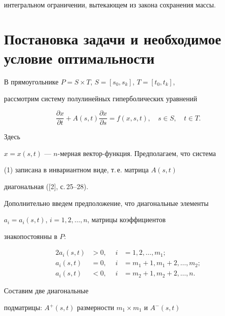 интегральном ограничении, вытекающем из закона сохранения массы.








\section{Постановка задачи и необходимое условие оптимальности}





В прямоугольнике $P=S\times T$, $S=[s_0,s_k]$, $T=[t_0,t_k]$,


рассмотрим систему полулинейных гиперболических уравнений


\begin{equation}


\frac{\partial x}{\partial t} +A(s,t)\frac{\partial x}{\partial s}


= f(x,s,t), \quad s \in S, \quad t \in T.


\end{equation}


Здесь


$x=x(s,t)$ --- $n$-мерная вектор-функция. Предполагаем, что система


(1) записана в инвариантном виде, т.\,е. матрица $A(s,t)$ 


диагональная ([2], с.\,25--28).





Дополнительно введем предположение, что диагональные элементы


$a_i=a_i(s,t)$, $i=1,2,\dotsc,n$, матрицы коэффициентов


знакопостоянны в $P$:


\begin{alignat*}{2}


a_i(s,t)&>0, &\ \ i&=1,2,\dotsc,m_1;\\


a_i(s,t)&=0, &\ \ i&=m_1+1, m_1+2,\dotsc, m_2;\\


a_i(s,t)&<0, &\ \ 


i&=m_2+1, m_2+2,\dotsc, n.


\end{alignat*}


Составим две диагональные


подматрицы: $A^+(s,t)$ размерности $m_1\times m_1$ и $A^-(s,t)$


